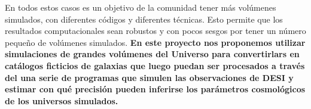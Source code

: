 En todos estos casos es un objetivo de la comunidad tener más
volúmenes simulados, con diferentes códigos y diferentes técnicas. 
Esto permite que los resultados computacionales sean robustos y con
pocos sesgos por tener un número pequeño de volúmenes simulados. 
{\bf En este proyecto nos proponemos utilizar simulaciones de grandes
volúmenes del Universo para convertirlars en cat\'alogos ficticios de
galaxias que  luego puedan ser procesados a trav\'es del una serie de
programas que simulen las observaciones de DESI y estimar con qu\'e
precisi\'on pueden inferirse los par\'ametros cosmol\'ogicos de los
universos simulados.}











